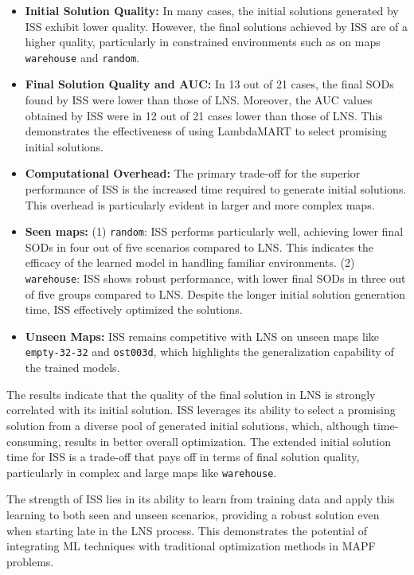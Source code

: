 \documentclass[runningheads]{llncs}
\begin{document}
\begin{itemize}
    \item \textbf{Initial Solution Quality:} In many cases, the initial solutions generated by ISS exhibit lower quality. However, the final solutions achieved by ISS are of a higher quality, particularly in constrained environments such as on maps \texttt{warehouse} and \texttt{random}. 
    \item \textbf{Final Solution Quality and AUC:} In 13 out of 21 cases, the final SODs found by ISS were lower than those of LNS. Moreover, the AUC values obtained by ISS were in 12 out of 21 cases lower than those of LNS. This demonstrates the effectiveness of using LambdaMART to select promising initial solutions.
    \item \textbf{Computational Overhead:} The primary trade-off for the superior performance of ISS is the increased time required to generate initial solutions. This overhead is particularly evident in larger and more complex maps.
    \item \textbf{Seen maps:} (1) \texttt{random}: ISS performs particularly well, achieving lower final SODs in four out of five scenarios compared to LNS. This indicates the efficacy of the learned model in handling familiar environments. (2) \texttt{warehouse}: ISS shows robust performance, with lower final SODs in three out of five groups compared to LNS. Despite the longer initial solution generation time, ISS effectively optimized the solutions.
    \item \textbf{Unseen Maps:} ISS remains competitive with LNS on unseen maps like \texttt{empty-32-32} and \texttt{ost003d}, which highlights the generalization capability of the trained models.
\end{itemize}

The results indicate that the quality of the final solution in LNS is strongly correlated with its initial solution. ISS leverages its ability to select a promising solution from a diverse pool of generated initial solutions, which, although time-consuming, results in better overall optimization. The extended initial solution time for ISS is a trade-off that pays off in terms of final solution quality, particularly in complex and large maps like \texttt{warehouse}.

The strength of ISS lies in its ability to learn from training data and apply this learning to both seen and unseen scenarios, providing a robust solution even when starting late in the LNS process. This demonstrates the potential of integrating ML techniques with traditional optimization methods in MAPF problems.
\end{document}

